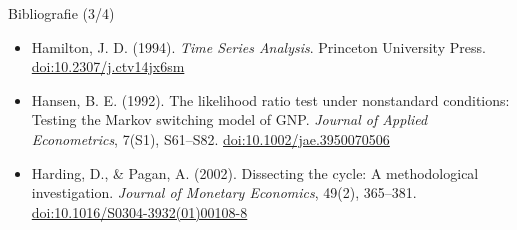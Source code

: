 \begin{frame}{Bibliografie (3/4)}
\begin{itemize}
    \item Hamilton, J. D. (1994). \textit{Time Series Analysis}. Princeton University Press. \href{https://doi.org/10.2307/j.ctv14jx6sm}{doi:10.2307/j.ctv14jx6sm}
    \item Hansen, B. E. (1992). The likelihood ratio test under nonstandard conditions: Testing the Markov switching model of GNP. \textit{Journal of Applied Econometrics}, 7(S1), S61--S82. \href{https://doi.org/10.1002/jae.3950070506}{doi:10.1002/jae.3950070506}
    \item Harding, D., \& Pagan, A. (2002). Dissecting the cycle: A methodological investigation. \textit{Journal of Monetary Economics}, 49(2), 365--381. \href{https://doi.org/10.1016/S0304-3932(01)00108-8}{doi:10.1016/S0304-3932(01)00108-8}
\end{itemize}
\end{frame}

